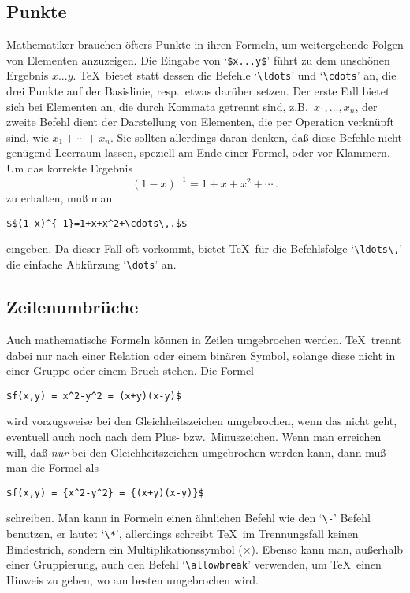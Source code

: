 \subsection{Punkte}
Mathematiker brauchen \"ofters Punkte in ihren Formeln, um weitergehende
Folgen von Elementen anzuzeigen. Die Eingabe von `\verb|$x...y$|'
f\"uhrt zu dem unsch\"onen Ergebnis $x...y$. \TeX\ bietet statt dessen die
Befehle 
`\verb|\ldots|' und 
`\verb|\cdots|' an, die drei Punkte auf
der 
Basislinie, resp.\ etwas dar\"uber setzen. Der erste Fall bietet
sich bei Elementen an, die durch Kommata getrennt sind, z.B.\
$x_1,\ldots,x_n$, der zweite Befehl dient der Darstellung von
Elementen, die per Operation verkn\"upft sind, wie $x_1+\cdots+x_n$. Sie
sollten allerdings daran denken, da\ss{} diese Befehle nicht gen\"ugend
\index{Leer!Raum}
Leerraum lassen, speziell am Ende einer Formel, oder vor Klammern. Um
das korrekte Ergebnis
$$(1-x)^{-1}=1+x+x^2+\cdots\,.$$
zu erhalten, mu\ss{} man
\begin{verbatim}
$$(1-x)^{-1}=1+x+x^2+\cdots\,.$$
\end{verbatim}
eingeben. Da dieser Fall oft vorkommt, bietet \TeX\ f\"ur die
Befehlsfolge 
`\verb|\ldots\,|' die einfache 
Abk\"urzung `\verb|\dots|'
an.

\subsection{Zeilenumbr\"uche}
Auch mathematische Formeln k\"onnen in Zeilen umgebrochen werden. \TeX\
trennt dabei nur nach einer 
Relation oder einem bin\"aren Symbol,
solange diese nicht in einer Gruppe oder einem 
Bruch stehen. Die Formel
\begin{verbatim}
$f(x,y) = x^2-y^2 = (x+y)(x-y)$
\end{verbatim}
wird vorzugsweise bei den 
Gleichheitszeichen umgebrochen, wenn das
nicht geht, eventuell auch noch nach dem Plus- bzw.\
Minuszeichen. Wenn
man erreichen will, da\ss{} {\em nur} bei den Gleichheitszeichen
umgebrochen werden kann, dann mu\ss{} man die Formel als
\begin{verbatim}
$f(x,y) = {x^2-y^2} = {(x+y)(x-y)}$
\end{verbatim}
schreiben. Man kann in Formeln einen \"ahnlichen Befehl wie den
`\verb|\-|' Befehl benutzen, er lautet `\verb|\*|', allerdings
schreibt \TeX\ im Trennungsfall keinen 
Bindestrich, sondern ein
\index{Multiplikation!Symbol}
Multiplikationssymbol ($\times$). Ebenso kann man, au\ss{}erhalb einer
Gruppierung, auch den Befehl 
`\verb|\allowbreak|' verwenden, um \TeX\
einen Hinweis zu geben, wo am besten umgebrochen wird.

